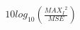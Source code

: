 \documentclass[preview]{standalone}
\begin{document}
\begin{align*}
10log_{10}(\frac{{MAX_I}^2}{MSE})
\end{align*}
\end{document}
